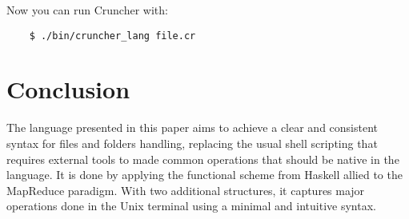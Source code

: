 \documentclass{article}
\begin{document}
Now you can run Cruncher with:
\begin{verbatim}
    $ ./bin/cruncher_lang file.cr
\end{verbatim}

\section{Conclusion}
\label{sec:conclusion}
The language presented in this paper aims to achieve a clear and consistent
syntax for files and folders handling, replacing the usual shell scripting that
requires external tools to made common operations that should be native in the
language. It is done by applying the functional scheme from Haskell allied to
the MapReduce paradigm. With two additional structures, it captures major
operations done in the Unix terminal using a minimal and intuitive syntax.



\end{document}
